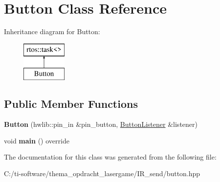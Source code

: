 \hypertarget{class_button}{}\section{Button Class Reference}
\label{class_button}
Inheritance diagram for Button\+:\begin{figure}[H]
\begin{center}
\leavevmode
\includegraphics[height=2.000000cm]{class_button}
\end{center}
\end{figure}
\subsection*{Public Member Functions}
\begin{DoxyCompactItemize}
\item 
\mbox{\label{class_button_a80936947d8417cfa53fcc22fdb867f96}} 
{\bfseries Button} (hwlib\+::pin\+\_\+in \&pin\+\_\+button, \mbox{\hyperlink{class_button_listener}{Button\+Listener}} \&listener)
\item 
\mbox{\label{class_button_a4cc671cc425acd0ee1b8f2f437cf40db}} 
void {\bfseries main} () override
\end{DoxyCompactItemize}


The documentation for this class was generated from the following file\+:\begin{DoxyCompactItemize}
\item 
C\+:/ti-\/software/thema\+\_\+opdracht\+\_\+lasergame/\+I\+R\+\_\+send/button.\+hpp\end{DoxyCompactItemize}

